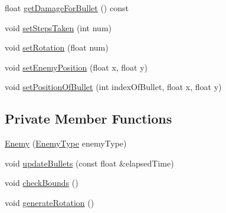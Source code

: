 \begin{DoxyCompactItemize}
float \hyperlink{class_enemy_a73e88b0f1e68650e6ea536c53a3cf920}{get\+Damage\+For\+Bullet} () const
\item 
void \hyperlink{class_enemy_a8ddda321d45a2fa6f35272087afe258b}{set\+Steps\+Taken} (int num)
\item 
void \hyperlink{class_enemy_ad02b7dfac0339e110f9aba837a815782}{set\+Rotation} (float num)
\item 
void \hyperlink{class_enemy_a6a83e4ff9dab297dbec1644dcc9152c6}{set\+Enemy\+Position} (float x, float y)
\item 
void \hyperlink{class_enemy_a49e2b8533dc258764e7a0ee5c4990eeb}{set\+Position\+Of\+Bullet} (int index\+Of\+Bullet, float x, float y)
\end{DoxyCompactItemize}
\subsection*{Private Member Functions}
\begin{DoxyCompactItemize}
\item 
\hyperlink{class_enemy_a57306ac8f82213245655f4c5377b1d76}{Enemy} (\hyperlink{_enemy_8h_ac3e413a86119db4b031458c7259e268e}{Enemy\+Type} enemy\+Type)
\item 
void \hyperlink{class_enemy_a85b0344388ba2e073bd610cf88025037}{update\+Bullets} (const float \&elapsed\+Time)
\item 
void \hyperlink{class_enemy_ab446b847a18890227905674734f7017e}{check\+Bounds} ()
\item 
void \hyperlink{class_enemy_a66c71c54afd65734ed82983882a940e6}{generate\+Rotation} ()
\end{DoxyCompactItemize}
